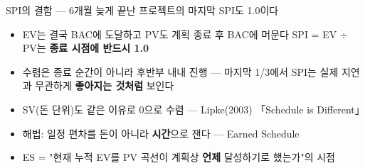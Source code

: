 \begin{frame}{SPI의 결함 — 6개월 늦게 끝난 프로젝트의 마지막 SPI도 1.0이다}
\begin{itemize}
\item EV는 결국 BAC에 도달하고 PV도 계획 종료 후 BAC에 머문다 \ra{} SPI = EV ÷ PV는 \textbf{종료 시점에 반드시 1.0}
\item 수렴은 종료 순간이 아니라 후반부 내내 진행 — 마지막 1/3에서 SPI는 실제 지연과 무관하게 \textbf{좋아지는 것처럼} 보인다
\item SV(돈 단위)도 같은 이유로 0으로 수렴 — Lipke(2003) 「Schedule is Different」
\item 해법: 일정 편차를 돈이 아니라 \textbf{시간}으로 잰다 — Earned Schedule
\item ES = "현재 누적 EV를 PV 곡선이 계획상 \textbf{언제} 달성하기로 했는가"의 시점
\end{itemize}
\end{frame}

